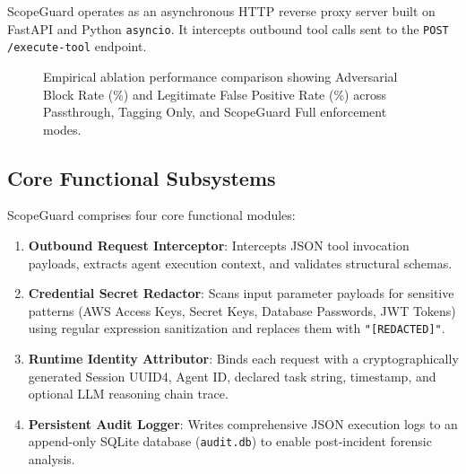\documentclass[conference]{IEEEtran}
\begin{document}
ScopeGuard operates as an asynchronous HTTP reverse proxy server built on FastAPI and Python \texttt{asyncio}. It intercepts outbound tool calls sent to the \texttt{POST /execute-tool} endpoint.

\begin{figure}[htbp]
\centering
{}
\caption{Empirical ablation performance comparison showing Adversarial Block Rate (\%) and Legitimate False Positive Rate (\%) across Passthrough, Tagging Only, and ScopeGuard Full enforcement modes.}
\label{fig:ablation_performance}
\end{figure}

\subsection{Core Functional Subsystems}
ScopeGuard comprises four core functional modules:
\begin{enumerate}
    \item \textbf{Outbound Request Interceptor}: Intercepts JSON tool invocation payloads, extracts agent execution context, and validates structural schemas.
    \item \textbf{Credential Secret Redactor}: Scans input parameter payloads for sensitive patterns (AWS Access Keys, Secret Keys, Database Passwords, JWT Tokens) using regular expression sanitization and replaces them with \texttt{"[REDACTED]"}.
    \item \textbf{Runtime Identity Attributor}: Binds each request with a cryptographically generated Session UUID4, Agent ID, declared task string, timestamp, and optional LLM reasoning chain trace.
    \item \textbf{Persistent Audit Logger}: Writes comprehensive JSON execution logs to an append-only SQLite database (\texttt{audit.db}) to enable post-incident forensic analysis.
\end{enumerate}
\end{document}
